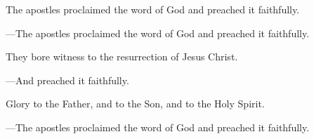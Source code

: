 \responsory

\begin{hangpar}
The apostles proclaimed the word of God and preached it faithfully.

{\color{red}---\thinspace}The apostles proclaimed the word of God and preached it faithfully.

\medskip They bore witness to the resurrection of Jesus Christ.

{\color{red}---\thinspace}And preached it faithfully.

\medskip Glory to the Father, and to the Son, and to the Holy Spirit.

{\color{red}---\thinspace}The apostles proclaimed the word of God and preached it faithfully.
\end{hangpar}
